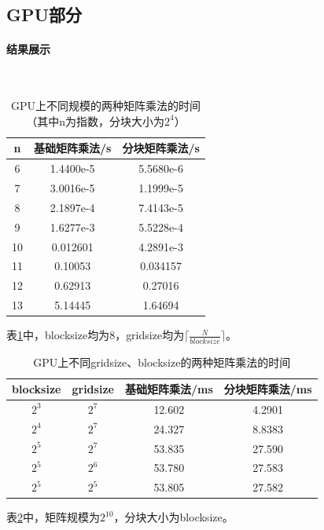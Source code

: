 \documentclass[UTF8]{article}
\begin{document}
    \subsection{GPU部分}
    \paragraph{结果展示}\mbox{}\\
    \begin{table}[H]
        \centering
        \caption{GPU上不同规模的两种矩阵乘法的时间（其中n为指数，分块大小为$2^4$）}
        \begin{tabular}{ccc}
            \hline
            n & 基础矩阵乘法/s & 分块矩阵乘法/s \\
            \hline
            6 & 1.4400e-5 & 5.5680e-6 \\
            7 & 3.0016e-5 & 1.1999e-5 \\
            8 & 2.1897e-4 & 7.4143e-5 \\
            9 & 1.6277e-3 & 5.5228e-4 \\
            10 & 0.012601 & 4.2891e-3 \\
            11 & 0.10053 & 0.034157 \\
            12 & 0.62913 & 0.27016 \\
            13 & 5.14445 & 1.64694 \\
            \hline
        \end{tabular}
        \label{gpu}
    \end{table}
    表\ref{gpu}中，{\jetbrains blocksize}均为$8$，{\jetbrains gridsize}均为$\lceil\frac{N}{block size}\rceil$。
    \begin{table}[H]
        \centering
        \caption{GPU上不同{\jetbrains gridsize}、{\jetbrains blocksize}的两种矩阵乘法的时间}
        \begin{tabular}{cccc}
            \hline
            blocksize & gridsize & 基础矩阵乘法/ms & 分块矩阵乘法/ms \\
            \hline
            $2^3$ & $2^7$ & 12.602 & 4.2901 \\
            $2^4$ & $2^7$ & 24.327 & 8.8383 \\
            $2^5$ & $2^7$ & 53.835 & 27.590 \\
            $2^5$ & $2^6$ & 53.780 & 27.583 \\
            $2^5$ & $2^5$ & 53.805 & 27.582 \\
            \hline
        \end{tabular}
        \label{gpu size}
    \end{table}
    表\ref{gpu size}中，矩阵规模为$2^{10}$，分块大小为{\jetbrains blocksize}。
\end{document}
